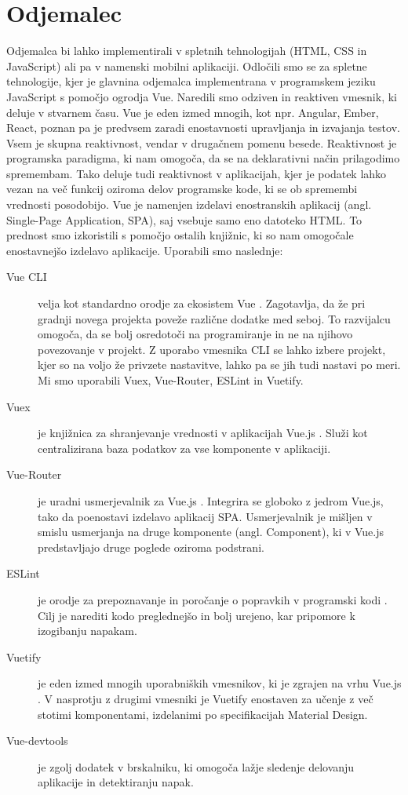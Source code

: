 \documentclass[a4paper, 12pt]{book}
\begin{document}
\section{Odjemalec}

Odjemalca bi lahko implementirali v spletnih tehnologijah (HTML, CSS in JavaScript) ali pa v namenski mobilni aplikaciji. Odločili smo se za spletne tehnologije, kjer je glavnina odjemalca implementrana v programskem jeziku JavaScript s pomočjo ogrodja Vue.  Naredili smo odziven in reaktiven vmesnik, ki deluje v stvarnem času. Vue je eden izmed mnogih, kot npr. Angular, Ember, React, poznan pa je predvsem zaradi enostavnosti upravljanja in izvajanja testov. Vsem je skupna reaktivnost, vendar v drugačnem pomenu besede. Reaktivnost \cite{reaktivnost} je programska paradigma, ki nam omogoča, da se na deklarativni način prilagodimo spremembam. Tako deluje tudi reaktivnost v aplikacijah, kjer je podatek lahko vezan na več funkcij oziroma delov programske kode, ki se ob spremembi vrednosti posodobijo. Vue je namenjen izdelavi enostranskih aplikacij (angl. Single-Page Application, SPA), saj vsebuje samo eno datoteko HTML. To prednost smo izkoristili s pomočjo ostalih knjižnic, ki so nam omogočale enostavnejšo izdelavo aplikacije. Uporabili smo naslednje:
\begin{description}
\item[Vue CLI] velja kot standardno orodje za ekosistem Vue \cite{VueCLI}. Zagotavlja, da že pri gradnji novega projekta poveže različne dodatke med seboj. To razvijalcu omogoča, da se bolj osredotoči na programiranje in ne na njihovo povezovanje v projekt. Z uporabo vmesnika CLI se lahko izbere projekt, kjer so na voljo že privzete nastavitve, lahko pa se jih tudi nastavi po meri. Mi smo uporabili Vuex, Vue-Router, ESLint in Vuetify.
\item[Vuex] je knjižnica za shranjevanje vrednosti v aplikacijah Vue.js \cite{Vuex}. Služi kot centralizirana baza podatkov za vse komponente v aplikaciji. 
\item[Vue-Router] je uradni usmerjevalnik za Vue.js \cite{VueRouter}. Integrira se globoko z jedrom Vue.js, tako da poenostavi izdelavo aplikacij SPA. Usmerjevalnik je mišljen v smislu usmerjanja na druge komponente (angl. Component), ki v Vue.js predstavljajo druge poglede oziroma podstrani.
\item[ESLint] je orodje za prepoznavanje in poročanje o popravkih v programski kodi \cite{ESLint}. Cilj je narediti kodo preglednejšo in bolj urejeno, kar pripomore k izogibanju napakam.
\item[Vuetify] je eden izmed mnogih uporabniških vmesnikov, ki je zgrajen na vrhu Vue.js \cite{Vuetify}. V nasprotju z drugimi vmesniki je Vuetify enostaven za učenje z več stotimi komponentami, izdelanimi po specifikacijah Material Design.
\item[Vue-devtools] je zgolj dodatek v brskalniku, ki omogoča lažje sledenje delovanju aplikacije in detektiranju napak. 
\end{description}
\end{document}
